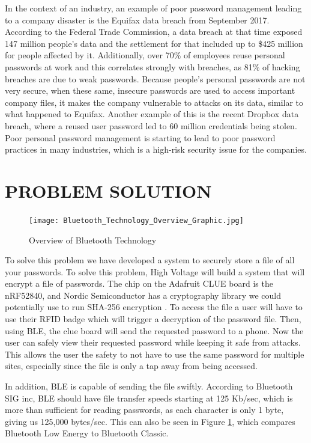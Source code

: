 \documentclass[12pt]{article}
\begin{document}
In the context of an industry, an example of poor password management leading to a company disaster is the Equifax data breach from September 2017. According to the Federal Trade Commission, a data breach at that time exposed 147 million people's data and the settlement for that included up to \$425 million for people affected by it\cite{equi-breach}. Additionally, over 70\% of employees reuse personal passwords at work and this correlates strongly with breaches, as 81\% of hacking breaches are due to weak passwords\cite{nd-breaches}. Because people's personal passwords are not very secure, when these same, insecure passwords are used to access important company files, it makes the company vulnerable to attacks on its data, similar to what happened to Equifax. Another example of this is the recent Dropbox data breach, where a reused user password led to 60 million credentials being stolen\cite{nd-breaches}. Poor personal password management is starting to lead to poor password practices in many industries, which is a high-risk security issue for the companies.

\section{PROBLEM SOLUTION}

\begin{figure}[!h]
\centering
\texttt{[image: Bluetooth\_Technology\_Overview\_Graphic.jpg]}
\caption{Overview of Bluetooth Technology}
\label{fig:bluetooth-info}
\end{figure}

To solve this problem we have developed a system to securely store a file of all your passwords. To solve this problem, High Voltage will build a system that will encrypt a file of passwords. The chip on the Adafruit CLUE board is the nRF52840, and Nordic Semiconductor has a cryptography library we could potentially use to run SHA-256 encryption \cite{cryt-lib}. To access the file a user will have to use their RFID badge which will trigger a decryption of the password file. Then, using BLE, the clue board will send the requested password to a phone. Now the user can safely view their requested password while keeping it safe from attacks. This allows the user the safety to not have to use the same password for multiple sites, especially since the file is only a tap away from being accessed. 

In addition, BLE is capable of sending the file swiftly. According to Bluetooth SIG inc, BLE should have file transfer speeds starting at 125 Kb/sec, which is more than sufficient for reading passwords, as each character is only 1 byte, giving us 125,000 bytes/sec. \cite{ble-info} This can also be seen in Figure \ref{fig:bluetooth-info}, which compares Bluetooth Low Energy to Bluetooth Classic.
\end{document}

